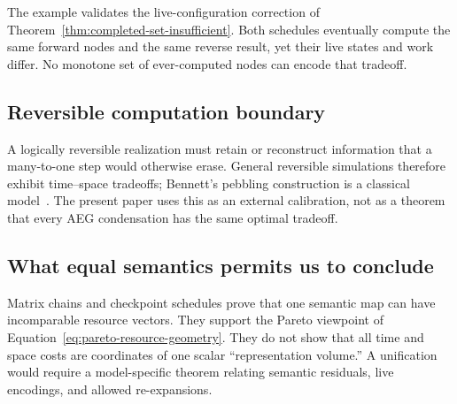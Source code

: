 The example validates the live-configuration correction of
Theorem~\ref{thm:completed-set-insufficient}.  Both schedules eventually compute
the same forward nodes and the same reverse result, yet their live states and
work differ.  No monotone set of ever-computed nodes can encode that tradeoff.

\subsection{Reversible computation boundary}

A logically reversible realization must retain or reconstruct information that
a many-to-one step would otherwise erase.  General reversible simulations
therefore exhibit time--space tradeoffs; Bennett's pebbling construction is a
classical model~\cite{Bennett1989}.  The present paper uses this as an external
calibration, not as a theorem that every AEG condensation has the same optimal
tradeoff.

\subsection{What equal semantics permits us to conclude}

Matrix chains and checkpoint schedules prove that one semantic map can have
incomparable resource vectors.  They support the Pareto viewpoint of
Equation~\eqref{eq:pareto-resource-geometry}.  They do not show that all time
and space costs are coordinates of one scalar ``representation volume.''  A
unification would require a model-specific theorem relating semantic residuals,
live encodings, and allowed re-expansions.
